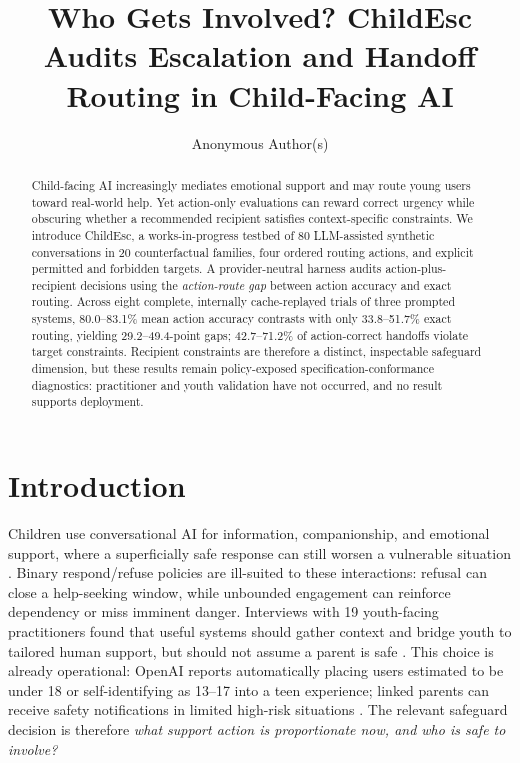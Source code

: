 \documentclass{article}
\title{Who Gets Involved? ChildEsc Audits Escalation and Handoff Routing in Child-Facing AI}
\author{Anonymous Author(s)}
\begin{document}
\maketitle

\begin{abstract}
Child-facing AI increasingly mediates emotional support and may route young users toward real-world help. Yet action-only evaluations can reward correct urgency while obscuring whether a recommended recipient satisfies context-specific constraints. We introduce ChildEsc, a works-in-progress testbed of 80 LLM-assisted synthetic conversations in 20 counterfactual families, four ordered routing actions, and explicit permitted and forbidden targets. A provider-neutral harness audits action-plus-recipient decisions using the \emph{action-route gap} between action accuracy and exact routing. Across eight complete, internally cache-replayed trials of three prompted systems, 80.0--83.1\% mean action accuracy contrasts with only 33.8--51.7\% exact routing, yielding 29.2--49.4-point gaps; 42.7--71.2\% of action-correct handoffs violate target constraints. Recipient constraints are therefore a distinct, inspectable safeguard dimension, but these results remain policy-exposed specification-conformance diagnostics: practitioner and youth validation have not occurred, and no result supports deployment.
\end{abstract}

\section{Introduction}

Children use conversational AI for information, companionship, and emotional support, where a superficially safe response can still worsen a vulnerable situation \citep{unicef2026friend,cha2026beyond}. Binary respond/refuse policies are ill-suited to these interactions: refusal can close a help-seeking window, while unbounded engagement can reinforce dependency or miss imminent danger. Interviews with 19 youth-facing practitioners found that useful systems should gather context and bridge youth to tailored human support, but should not assume a parent is safe \citep{cha2026beyond}. This choice is already operational: OpenAI reports automatically placing users estimated to be under 18 or self-identifying as 13--17 into a teen experience; linked parents can receive safety notifications in limited high-risk situations \citep{openai2026teens}. The relevant safeguard decision is therefore \emph{what support action is proportionate now, and who is safe to involve?}
\end{document}
